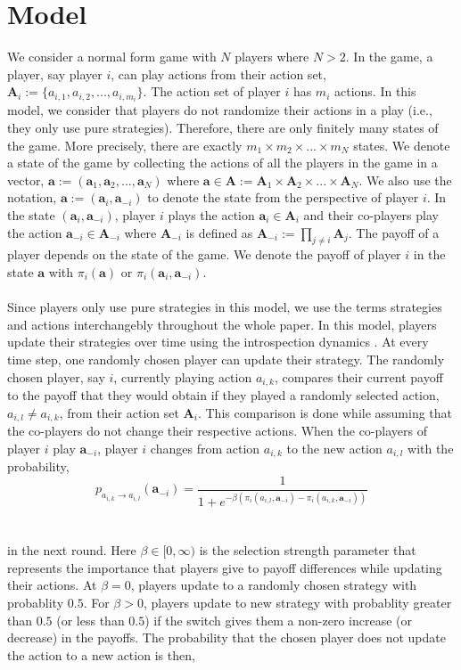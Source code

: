 \documentclass[11pt]{article}
\theoremstyle{plainCl1}
\theoremstyle{plainCl2}
\newcommand{\A}{\mathbf{A}}
\newcommand{\abf}{\mathbf{a}}
\begin{document}
\section*{Model}
We consider a normal form game with $N$ players where $N > 2$. In the game, a player, say player $i$, can play actions from their action set, $\A_i := \{a_{i,1}, a_{i,2}, ..., a_{i,m_i} \}$. The action set of player $i$ has $m_i$ actions. In this model, we consider that players do not randomize their actions in a play (i.e., they only use pure strategies). Therefore, there are only finitely many states of the game. More precisely, there are exactly $m_1 \times m_2 \times ... \times m_N$ states. We denote a state of the game by collecting the actions of all the players in the game in a vector, $\abf := (\abf_1, \abf_2, ..., \abf_N)$ where $\abf \in \A := \A_1 \times \A_2 \times ... \times \A_N$. We also use the notation, $\abf := (\abf_i, \abf_{-i})$ to denote the state from the perspective of player $i$. In the state $(\abf_i, \abf_{-i})$, player $i$ plays the action $\abf_i \in \A_i$ and their co-players play the action $\abf_{-i} \in \A_{-i}$ where $\A_{-i}$ is defined as $\A_{-i}:= \prod_{j \neq i} \A_j$. The payoff of a player depends on the state of the game. We denote the payoff of player $i$ in the state $\abf$ with $\pi_i(\abf)$ or $\pi_i(\abf_i, \abf_{-i})$. \\ \\ 
\noindent Since players only use pure strategies in this model, we use the terms strategies and actions interchangebly throughout the whole paper. In this model, players update their strategies over time using the introspection dynamics \cite{Couto:NJP:2022}. At every time step, one randomly chosen player can update their strategy. The randomly chosen player, say $i$, currently playing  action $a_{i,k}$, compares their current payoff to the payoff that they would obtain if they played a randomly selected action,  $a_{i,l} \neq a_{i,k}$, from their action set $\A_i$. This comparison is done while assuming that the co-players do not change their respective actions. When the co-players of player $i$ play $\abf_{-i}$, player $i$ changes from action $a_{i,k}$ to the new action $a_{i,l}$ with the probability, \\
\begin{equation}
 p_{a_{i,k} \to a_{i,l}} (\abf_{-i})= \frac{1}{1 + e^{\displaystyle -\beta(\pi_i(a_{i,l}, \abf_{-i}) - \pi_i(a_{i,k}, \abf_{-i}))}}
 \label{Eq:introspection-update}
\end{equation}
\\ \\ \noindent in the next round. Here $\beta \in [0,\infty)$ is the selection strength parameter that represents the importance that players give to payoff differences while updating their actions. At $\beta = 0$, players update to a randomly chosen strategy with probablity $0.5$. For $\beta > 0$, players update to new strategy with probablity greater than $0.5$ (or less than $0.5$) if the switch gives them a non-zero increase (or decrease) in the payoffs. The probability that the chosen player does not update the action to a new action is then, \\
\end{document}
